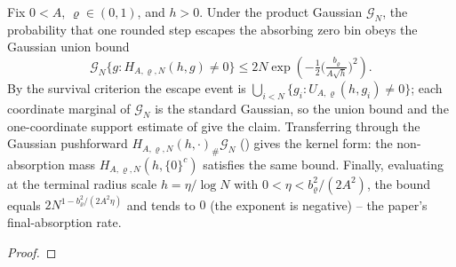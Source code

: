 \begin{lemma}
  \label{lem:subcritical-exact-escape-probability}
  \leanok
  Fix $0<A$, $\varrho\in(0,1)$, and $h>0$.  Under the product Gaussian
  $\mathcal G_N$, the probability that one rounded step escapes the absorbing zero
  bin obeys the Gaussian union bound
  \[
    \mathcal G_N\{g : H_{A,\varrho,N}(h,g)\neq0\}
    \leq
    2N\exp\!\left(
      -\tfrac12\Big(\tfrac{b_\varrho}{A\sqrt h}\Big)^2
    \right).
  \]
  By the survival criterion the escape event is
  $\bigcup_{i<N}\{g_i:U_{A,\varrho}(h,g_i)\neq0\}$; each coordinate marginal of
  $\mathcal G_N$ is the standard Gaussian, so the union bound and the one-coordinate
  support estimate of  give the claim.
  Transferring through the Gaussian pushforward $H_{A,\varrho,N}(h,\cdot)_\#\mathcal
  G_N$ () gives the kernel form: the non-absorption mass
  $H_{A,\varrho,N}(h,\{0\}^c)$ satisfies the same bound.  Finally, evaluating at the
  terminal radius scale $h=\eta/\log N$ with $0<\eta<b_\varrho^2/(2A^2)$, the bound
  equals $2N^{1-b_\varrho^2/(2A^2\eta)}$ and tends to $0$ (the exponent is negative) --
  the paper's final-absorption rate.
\end{lemma}
\begin{proof}\leanok
\end{proof}

